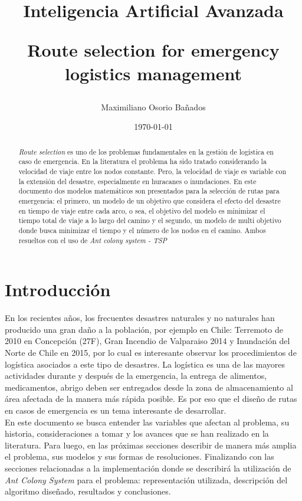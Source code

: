 \documentclass[letter, 10pt]{article}
\begin{document}
\title{Inteligencia Artificial Avanzada \\ \begin{Large} Route selection for emergency logistics management\end{Large}}
\author{Maximiliano Osorio Bañados}
\date{\today}
\maketitle


\begin{abstract}
\textit{Route selection} es uno de los problemas fundamentales en la gestión de logística en caso de emergencia. En la literatura el problema ha sido tratado considerando la velocidad de viaje entre los nodos constante. Pero, la velocidad de viaje es variable con la extensión del desastre, especialmente en huracanes o inundaciones.
En este documento dos modelos matemáticos son presentados para la selección de rutas para emergencia: el primero, un modelo de un objetivo que considera el efecto del desastre en tiempo de viaje entre cada arco, o sea, el objetivo del modelo es minimizar el tiempo total de viaje a lo largo del camino y  el segundo, un modelo de multi objetivo donde busca minimizar el tiempo y el número de los nodos en el camino. Ambos resueltos con el uso de \textit{Ant colony system - TSP}
\end{abstract}

\section{Introducci\'on}

En los recientes años, los frecuentes desastres naturales y no naturales han producido una gran daño a la población, por ejemplo en Chile: Terremoto de 2010 en Concepción (27F), Gran Incendio de Valparaiso 2014 y Inundación del Norte de Chile en 2015, por lo cual es interesante observar los procedimientos de logística asociados a este tipo de desastres. La logística es una de las mayores actividades durante y después de la emergencia, la entrega de alimentos, medicamentos, abrigo deben ser entregados desde la zona de almacenamiento al área afectada de la manera más rápida posible. Es por eso que el diseño de rutas en casos de emergencia es un tema interesante de desarrollar. \\
En este documento se busca entender las variables que afectan al problema, su historia, consideraciones a tomar y los avances que se han realizado en la literatura. Para luego, en las próximas secciones describir de manera más amplia el problema, sus modelos y sus formas de resoluciones. Finalizando con las secciones relacionadas a la implementación donde se describirá la utilización de \textit{Ant Colony System} para el problema: representación utilizada, descripción del algoritmo diseñado, resultados y conclusiones. 
\end{document}
